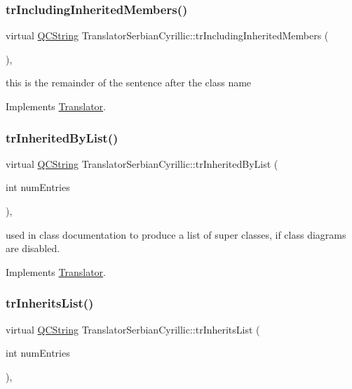 \subsubsection{\texorpdfstring{trIncludingInheritedMembers()}{trIncludingInheritedMembers()}}
{\footnotesize\ttfamily virtual \mbox{\hyperlink{class_q_c_string}{Q\+C\+String}} Translator\+Serbian\+Cyrillic\+::tr\+Including\+Inherited\+Members (\begin{DoxyParamCaption}{ }\end{DoxyParamCaption})\hspace{0.3cm}{\ttfamily [inline]}, {\ttfamily [virtual]}}

this is the remainder of the sentence after the class name 

Implements \mbox{\hyperlink{class_translator}{Translator}}.

\mbox{\label{class_translator_serbian_cyrillic_aedcfd05bfcadc55ac5ed9e78320ec3ca}} 
\subsubsection{\texorpdfstring{trInheritedByList()}{trInheritedByList()}}
{\footnotesize\ttfamily virtual \mbox{\hyperlink{class_q_c_string}{Q\+C\+String}} Translator\+Serbian\+Cyrillic\+::tr\+Inherited\+By\+List (\begin{DoxyParamCaption}\item[{int}]{num\+Entries }\end{DoxyParamCaption})\hspace{0.3cm}{\ttfamily [inline]}, {\ttfamily [virtual]}}

used in class documentation to produce a list of super classes, if class diagrams are disabled. 

Implements \mbox{\hyperlink{class_translator}{Translator}}.

\mbox{\label{class_translator_serbian_cyrillic_ab9c7c32c3505482a0bf58bb69dede806}} 
\subsubsection{\texorpdfstring{trInheritsList()}{trInheritsList()}}
{\footnotesize\ttfamily virtual \mbox{\hyperlink{class_q_c_string}{Q\+C\+String}} Translator\+Serbian\+Cyrillic\+::tr\+Inherits\+List (\begin{DoxyParamCaption}\item[{int}]{num\+Entries }\end{DoxyParamCaption})\hspace{0.3cm}{\ttfamily [inline]}, {\ttfamily [virtual]}}

